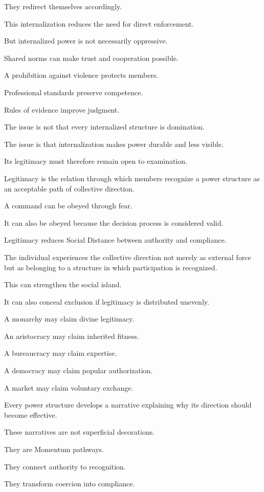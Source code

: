 They redirect themselves accordingly.

This internalization reduces the need for direct enforcement.

But internalized power is not necessarily oppressive.

Shared norms can make trust and cooperation possible.

A prohibition against violence protects members.

Professional standards preserve competence.

Rules of evidence improve judgment.

The issue is not that every internalized structure is domination.

The issue is that internalization makes power durable and less visible.

Its legitimacy must therefore remain open to examination.

Legitimacy is the relation through which members recognize a power structure as an acceptable path of collective direction.

A command can be obeyed through fear.

It can also be obeyed because the decision process is considered valid.

Legitimacy reduces Social Distance between authority and compliance.

The individual experiences the collective direction not merely as external force but as belonging to a structure in which participation is recognized.

This can strengthen the social island.

It can also conceal exclusion if legitimacy is distributed unevenly.

A monarchy may claim divine legitimacy.

An aristocracy may claim inherited fitness.

A bureaucracy may claim expertise.

A democracy may claim popular authorization.

A market may claim voluntary exchange.

Every power structure develops a narrative explaining why its direction should become effective.

These narratives are not superficial decorations.

They are Momentum pathways.

They connect authority to recognition.

They transform coercion into compliance.

